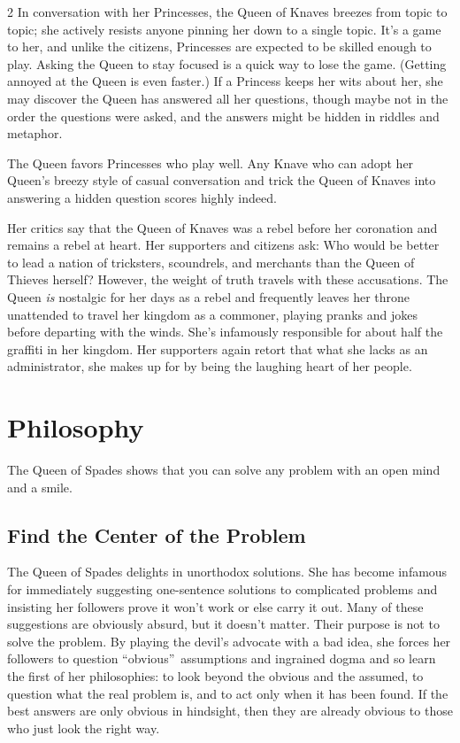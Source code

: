 \begin{multicols}{2}
In conversation with her Princesses, the Queen of Knaves breezes from topic to topic; she actively resists anyone pinning her down to a single topic. It's a game to her, and unlike the citizens, Princesses are expected to be skilled enough to play. Asking the Queen to stay focused is a quick way to lose the game. (Getting annoyed at the Queen is even faster.) If a Princess keeps her wits about her, she may discover the Queen has answered all her questions, though maybe not in the order the questions were asked, and the answers might be hidden in riddles and metaphor. 

The Queen favors Princesses who play well. Any Knave who can adopt her Queen's breezy style of casual conversation and trick the Queen of Knaves into answering a hidden question scores highly indeed.

Her critics say that the Queen of Knaves was a rebel before her coronation and remains a rebel at heart. Her supporters and citizens ask: Who would be better to lead a nation of tricksters, scoundrels, and merchants than the Queen of Thieves herself? However, the weight of truth travels with these accusations. The Queen \textit{is} nostalgic for her days as a rebel and frequently leaves her throne unattended to travel her kingdom as a commoner, playing pranks and jokes before departing with the winds. She's infamously responsible for about half the graffiti in her kingdom. Her supporters again retort that what she lacks as an administrator, she makes up for by being the laughing heart of her people. 

\section*{Philosophy}

The Queen of Spades shows that you can solve any problem with an open mind and a smile.

\subsection*{Find the Center of the Problem}

The Queen of Spades delights in unorthodox solutions. She has become infamous for immediately suggesting one-sentence solutions to complicated problems and insisting her followers prove it won't work or else carry it out. Many of these suggestions are obviously absurd, but it doesn't matter. Their purpose is not to solve the problem. By playing the devil's advocate with a bad idea, she forces her followers to question \textquotedblleft obvious\textquotedblright\, assumptions and ingrained dogma and so learn the first of her philosophies: to look beyond the obvious and the assumed, to question what the real problem is, and to act only when it has been found. If the best answers are only obvious in hindsight, then they are already obvious to those who just look the right way.



\end{multicols}
